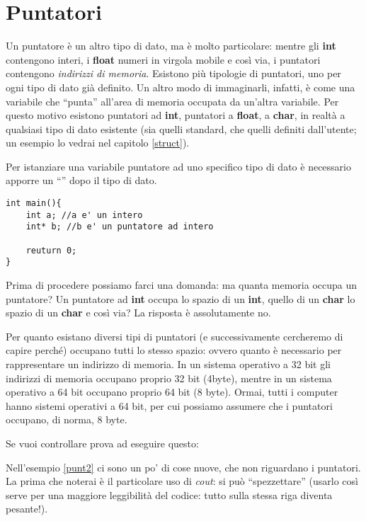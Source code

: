 	
	\chapter{Puntatori}
	Un puntatore è un altro tipo di dato, ma è molto particolare: mentre gli \textbf{int} contengono interi, i \textbf{float} numeri in virgola mobile e così via, i puntatori contengono \emph{indirizzi di memoria}. Esistono più tipologie di puntatori, uno per ogni tipo di dato già definito. Un altro modo di immaginarli, infatti, è come una variabile che ``punta'' all'area di memoria occupata da un'altra variabile. Per questo motivo esistono puntatori ad \textbf{int}, puntatori a \textbf{float}, a \textbf{char}, in realtà a qualsiasi tipo di dato esistente (sia quelli standard, che quelli definiti dall'utente; un esempio lo vedrai nel capitolo \ref{struct}).
	
	Per istanziare una variabile puntatore ad uno specifico tipo di dato è necessario apporre un ``\textasteriskcentered'' dopo il tipo di dato. 
	\begin{lstlisting}
int main(){
	int a; //a e' un intero
	int* b; //b e' un puntatore ad intero

	reuturn 0;
}
	\end{lstlisting}
	
	Prima di procedere possiamo farci una domanda: ma quanta memoria occupa un puntatore? Un puntatore ad \textbf{int} occupa lo spazio di un \textbf{int}, quello di un \textbf{char} lo spazio di un \textbf{char} e così via? La risposta è assolutamente no. 
	
	Per quanto esistano diversi tipi di puntatori (e successivamente cercheremo di capire perché) occupano tutti lo stesso spazio: ovvero quanto è necessario per rappresentare un indirizzo di memoria. In un sistema operativo a 32 bit gli indirizzi di memoria occupano proprio 32 bit (4byte), mentre in un sistema operativo a 64 bit occupano proprio 64 bit (8 byte). Ormai, tutti i computer hanno sistemi operativi a 64 bit, per cui possiamo assumere che i puntatori occupano, di norma, 8 byte. 
	

	Se vuoi controllare prova ad eseguire questo:
	
	
	
	Nell'esempio \ref{punt2} ci sono un po' di cose nuove, che non riguardano i puntatori. La prima che noterai è il particolare uso di \emph{cout}: si può ``spezzettare'' (usarlo così serve per una maggiore leggibilità del codice: tutto sulla stessa riga diventa pesante!).
	
